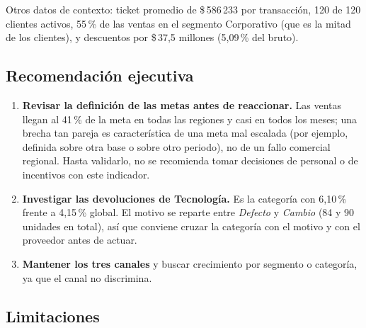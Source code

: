 \documentclass[11pt,letterpaper]{article}
\newcommand{\cop}[1]{\$\,#1}
\begin{document}
Otros datos de contexto: ticket promedio de \cop{586\,233} por transacción, 120 de 120 clientes activos, 55\,\% de
las ventas en el segmento Corporativo (que es la mitad de los clientes), y descuentos por \cop{37,5} millones
(5,09\,\% del bruto).

\subsection{Recomendación ejecutiva}

\begin{enumerate}
  \item \textbf{Revisar la definición de las metas antes de reaccionar.} Las ventas llegan al 41\,\% de la meta en todas
        las regiones y casi en todos los meses; una brecha tan pareja es característica de una meta mal escalada
        (por ejemplo, definida sobre otra base o sobre otro periodo), no de un fallo comercial regional. Hasta
        validarlo, no se recomienda tomar decisiones de personal o de incentivos con este indicador.
  \item \textbf{Investigar las devoluciones de Tecnología.} Es la categoría con 6,10\,\% frente a 4,15\,\% global.
        El motivo se reparte entre \emph{Defecto} y \emph{Cambio} (84 y 90 unidades en total), así que conviene
        cruzar la categoría con el motivo y con el proveedor antes de actuar.
  \item \textbf{Mantener los tres canales} y buscar crecimiento por segmento o categoría, ya que el canal no discrimina.
\end{enumerate}

\subsection{Limitaciones}
\end{document}
